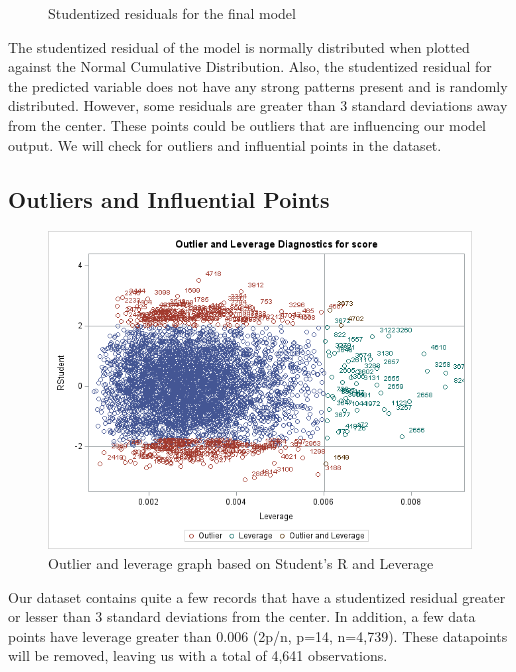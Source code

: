 \documentclass[12pt]{article}
\begin{document}
\begin{figure}[h]
\begin{minipage}[t]{0.5\textwidth}
        \label{fig:unemp_measures}
    \end{minipage}
    \caption{Studentized residuals for the final model}
    \label{fig:unemp_fig}
\end{figure}

The studentized residual of the model is normally distributed when plotted against the Normal Cumulative Distribution. Also, the studentized residual for the predicted variable does not have any strong patterns present and is randomly distributed. However, some residuals are greater than 3 standard deviations away from the center. These points could be outliers that are influencing our model output. We will check for outliers and influential points in the dataset.

\newpage
\subsection{Outliers and Influential Points}

\begin{figure}[h]
    \centering
    \includegraphics[width=\textwidth]{images/outlier_leverage.png}
    \caption{Outlier and leverage graph based on Student's R and Leverage}
    \label{fig:enter-label}
\end{figure}

Our dataset contains quite a few records that have a studentized residual greater or lesser than 3 standard deviations from the center. In addition, a few data points have leverage greater than 0.006 (2p/n, p=14, n=4,739). These datapoints will be removed, leaving us with a total of 4,641 observations.
\end{document}
